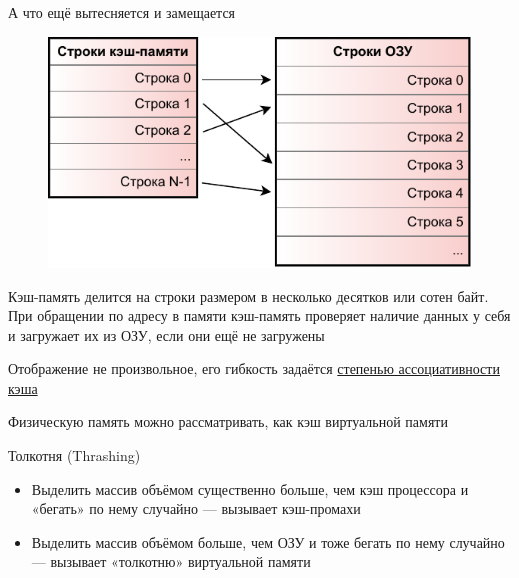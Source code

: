 \documentclass[xetex,aspectratio=43]{beamer}
\begin{document}
\begin{frame}{А что ещё вытесняется и замещается}

        \begin{figure}
            \includegraphics[page=1,height=0.45\textheight]{img/06.cache-and-vm-crop.pdf}
        \end{figure}


        Кэш-память делится на строки размером в несколько десятков или сотен
        байт. При обращении по адресу в памяти кэш-память проверяет наличие
        данных у себя и загружает их из ОЗУ, если они ещё не загружены

        Отображение не произвольное, его гибкость задаётся
        \href{https://en.wikipedia.org/wiki/Cache_placement_policies}{степенью ассоциативности кэша}

        \pause

        Физическую память можно рассматривать, как кэш виртуальной памяти
\end{frame}

\begin{frame}{Толкотня (Thrashing)}
        \begin{itemize}
            \item
            Выделить массив объёмом существенно больше, чем кэш процессора и
            «бегать» по нему случайно --- вызывает кэш-промахи
            \item
            Выделить массив объёмом больше, чем ОЗУ и тоже бегать по нему случайно
            --- вызывает «толкотню» виртуальной памяти
        \end{itemize}
\end{frame}
\end{document}
